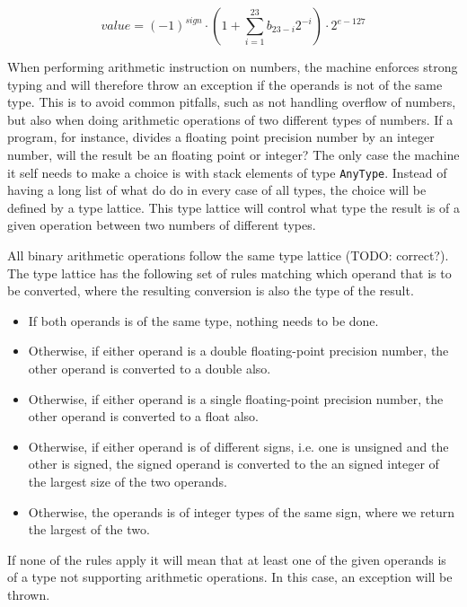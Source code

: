 \begin{equation}
  value = (-1)^{sign} \cdot (1 + \sum^{23}_{i=1} b_{23-i}2^{-i}) \cdot 2^{e - 127}
\end{equation}


When performing arithmetic instruction on numbers, the machine enforces strong
typing and will therefore throw an exception if the operands is not of the same
type. This is to avoid common pitfalls, such as not handling overflow of
numbers, but also when doing arithmetic operations of two different types of
numbers. If a program, for instance, divides a floating point precision number
by an integer number, will the result be an floating point or integer? The only
case the machine it self needs to make a choice is with stack elements of type
{\tt AnyType}. Instead of having a long list of what do do in every case of all
types, the choice will be defined by a type lattice. This type lattice will
control what type the result is of a given operation between two numbers of
different types.

All binary arithmetic operations follow the same type lattice (TODO:
correct?). The type lattice has the following set of rules matching which
operand that is to be converted, where the resulting conversion is also the type
of the result.
\begin{itemize}
  \item If both operands is of the same type, nothing needs to be done.
  \item Otherwise, if either operand is a double floating-point precision
    number, the other operand is converted to a double also.
  \item Otherwise, if either operand is a single floating-point precision
    number, the other operand is converted to a float also.
  \item Otherwise, if either operand is of different signs, i.e. one is unsigned
    and the other is signed, the signed operand is converted to the an signed
    integer of the largest size of the two operands.
  \item Otherwise, the operands is of integer types of the same sign, where we
    return the largest of the two.
\end{itemize}

If none of the rules apply it will mean that at least one of the given operands
is of a type not supporting arithmetic operations. In this case, an exception
will be thrown.

